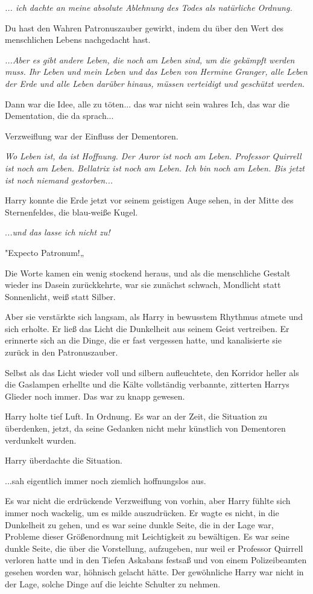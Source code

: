 {\emph{..\emph{. ich dachte an meine absolute Ablehnung des Todes als natürliche Ordnung.}}

Du hast den Wahren Patronuszauber gewirkt, indem du über den Wert des menschlichen Lebens nachgedacht hast.

\emph{...Aber es gibt andere Leben, die noch am Leben sind, um die gekämpft werden muss. Ihr Leben und mein Leben und das Leben von Hermine Granger, alle Leben der Erde und alle Leben darüber hinaus, müssen verteidigt und geschützt werden.}

Dann war die Idee, alle zu töten... das war nicht sein wahres Ich, das war die Dementation, die da sprach...

Verzweiflung war der Einfluss der Dementoren.

\emph{Wo Leben ist, da ist Hoffnung. Der Auror ist noch am Leben. Professor Quirrell ist noch am Leben. Bellatrix ist noch am Leben. Ich bin noch am Leben. Bis jetzt ist noch niemand gestorben...}

Harry konnte die Erde jetzt vor seinem geistigen Auge sehen, in der Mitte des Sternenfeldes, die blau-weiße Kugel.

.\emph{..und das lasse ich nicht zu!}

"Expecto Patronum!„

Die Worte kamen ein wenig stockend heraus, und als die menschliche Gestalt wieder ins Dasein zurückkehrte, war sie zunächst schwach, Mondlicht statt Sonnenlicht, weiß statt Silber.

Aber sie verstärkte sich langsam, als Harry in bewusstem Rhythmus atmete und sich erholte. Er ließ das Licht die Dunkelheit aus seinem Geist vertreiben. Er erinnerte sich an die Dinge, die er fast vergessen hatte, und kanalisierte sie zurück in den Patronuszauber.

Selbst als das Licht wieder voll und silbern aufleuchtete, den Korridor heller als die Gaslampen erhellte und die Kälte vollständig verbannte, zitterten Harrys Glieder noch immer. Das war zu knapp gewesen.

Harry holte tief Luft. In Ordnung. Es war an der Zeit, die Situation zu überdenken, jetzt, da seine Gedanken nicht mehr künstlich von Dementoren verdunkelt wurden.

Harry überdachte die Situation.

...sah eigentlich immer noch ziemlich hoffnungslos aus.

Es war nicht die erdrückende Verzweiflung von vorhin, aber Harry fühlte sich immer noch wackelig, um es milde auszudrücken. Er wagte es nicht, in die Dunkelheit zu gehen, und es war seine dunkle Seite, die in der Lage war, Probleme dieser Größenordnung mit Leichtigkeit zu bewältigen. Es war seine dunkle Seite, die über die Vorstellung, aufzugeben, nur weil er Professor Quirrell verloren hatte und in den Tiefen Askabans festsaß und von einem Polizeibeamten gesehen worden war, höhnisch gelacht hätte. Der gewöhnliche Harry war nicht in der Lage, solche Dinge auf die leichte Schulter zu nehmen.

}

